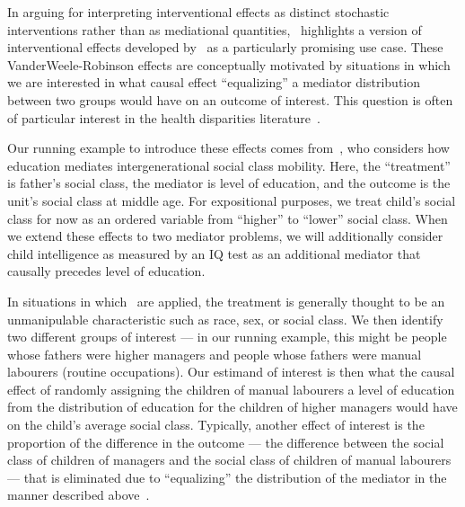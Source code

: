 
In arguing for interpreting interventional effects as distinct stochastic interventions rather than
as mediational quantities,~\cite{miles2023} highlights a version of interventional effects developed 
by~\cite{vanderweelerobinson2014} as a particularly promising use case. These 
VanderWeele-Robinson effects are conceptually motivated by situations in which we are interested 
in what causal effect ``equalizing'' a mediator distribution between two groups
would have on an outcome of interest. This question is often of particular interest in the health 
disparities literature~\citep{jacksonvanderweele2018}.

Our running example to introduce these effects comes from~\cite{kuhaetal2021}, 
who considers how education mediates intergenerational social class mobility. Here, the ``treatment'' is
father's social class, the mediator is level of education, and the outcome is the unit's social
class at middle age. For expositional purposes, 
we treat child's social class for now as an ordered variable from ``higher'' to ``lower''
social class. When we extend these effects to two mediator problems, we will additionally 
consider child intelligence as measured by an IQ test as an additional mediator that causally precedes
level of education. 

In situations in which~\cite{vanderweelerobinson2014} are applied, the treatment is generally 
thought to be an unmanipulable characteristic such as race, sex, or social class. 
We then identify two different groups of interest --- in our running example, this might be people 
whose fathers were higher managers and 
people whose fathers were manual labourers (routine occupations). Our estimand of interest 
is then what the causal effect of randomly assigning the children of manual labourers
a level of education from the distribution of education for the children of higher managers
would have on the child's average social class. Typically, another effect of interest is the 
proportion of the difference in the outcome --- the difference between the social class of children
of managers and the social class of children of manual labourers --- that is eliminated
due to ``equalizing'' the distribution of the mediator in the manner described 
above~\citep{vanderweelerobinson2014}. 

